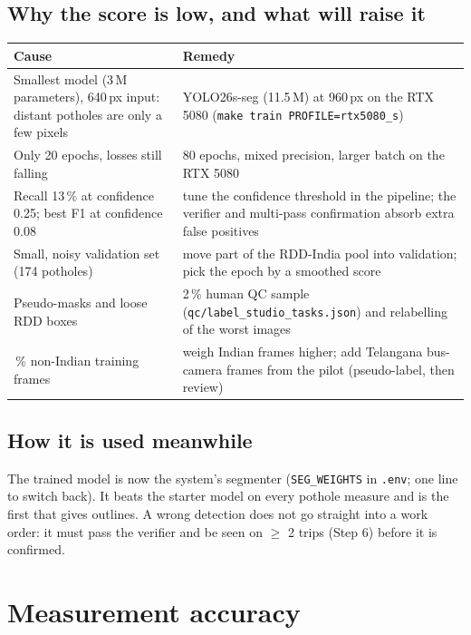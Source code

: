 \documentclass[11pt,a4paper]{article}
\newcommand{\code}[1]{\texttt{\small #1}}
\begin{document}
\subsection{Why the score is low, and what will raise it}
\begin{center}
\small
\begin{tabularx}{\textwidth}{@{}>{\raggedright\arraybackslash}p{50mm} X@{}}
\toprule
\textbf{Cause} & \textbf{Remedy}\\
\midrule
Smallest model (3\,M parameters), 640\,px input: distant potholes are only a few pixels & YOLO26s-seg (11.5\,M) at 960\,px on the RTX 5080 (\code{make train PROFILE=rtx5080\_s})\\
Only 20 epochs, losses still falling & 80 epochs, mixed precision, larger batch on the RTX 5080\\
Recall 13\,\% at confidence 0.25; best F1 at confidence 0.08 & tune the confidence threshold in the pipeline; the verifier and multi-pass confirmation absorb extra false positives\\
Small, noisy validation set (174 potholes) & move part of the RDD-India pool into validation; pick the epoch by a smoothed score\\
Pseudo-masks and loose RDD boxes & 2\,\% human QC sample (\code{qc/label\_studio\_tasks.json}) and relabelling of the worst images\\
36\,\% non-Indian training frames & weigh Indian frames higher; add Telangana bus-camera frames from the pilot (pseudo-label, then review)\\
\bottomrule
\end{tabularx}
\end{center}

\subsection{How it is used meanwhile}
The trained model is now the system's segmenter (\code{SEG\_WEIGHTS} in \code{.env}; one line to switch back). It
beats the starter model on every pothole measure and is the first that gives outlines. A wrong detection does not go
straight into a work order: it must pass the verifier and be seen on $\ge$ 2 trips (Step 6) before it is confirmed.

\section{Measurement accuracy}\label{sec:measure}
\end{document}

